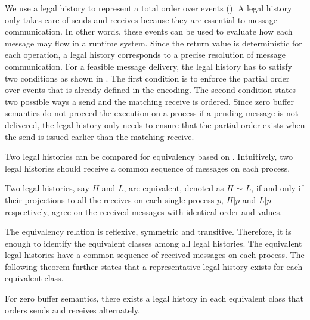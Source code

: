 We use a legal history to represent a total order over events (). A legal history only takes care of sends and receives because they are essential to message communication. In other words, these events can be used to evaluate how each message may flow in a runtime system. Since the return value is deterministic for each operation, a legal history corresponds to a precise resolution of message communication. For a feasible message delivery, the legal history has to satisfy two conditions as shown in . The first condition is to enforce the partial order over events that is already defined in the encoding. The second condition states two possible ways a send and the matching receive is ordered. Since zero buffer semantics do not proceed the execution on a process if a pending message is not delivered, the legal history only needs to ensure that the partial order exists when the send is issued earlier than the matching receive. 


Two legal histories can be compared for equivalency based on . Intuitively, two legal histories should receive a common sequence of messages on each process. 

\begin{definition}\label{def:er}
Two legal histories, say $H$ and $L$, are equivalent, denoted as $H$ $\sim$ $L$, if and only if their projections to all the receives on each single process $p$, $H | p$ and $L | p$ respectively, agree on the received messages with identical order and values.
\end{definition}

The equivalency relation is reflexive, symmetric and transitive. Therefore, it is enough to identify the equivalent classes among all legal histories. The equivalent legal histories have a common sequence of received messages on each process. The following theorem further states that a representative legal history exists for each equivalent class. 

\begin{theorem}
For zero buffer semantics, there exists a legal history in each equivalent class that orders sends and receives alternately.
\end{theorem}

